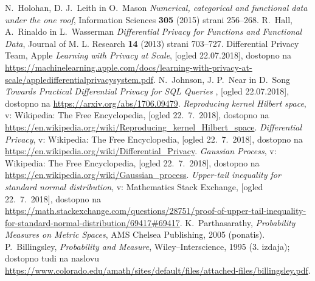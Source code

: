 \documentclass[12pt,a4paper]{amsart}
\theoremstyle{definition} %
\theoremstyle{plain} %
\begin{document}
\begin{thebibliography}{99}

N.~Holohan, D. J.~Leith in O.~Mason \emph{Numerical, categorical and functional data under the one roof}, Information Sciences \textbf{305} (2015) strani 256--268.
R.~Hall, A.~Rinaldo in L.~Wasserman \emph{Differential Privacy for Functions and Functional Data}, Journal of M. L. Research \textbf{14} (2013) strani 703--727.
Differential Privacy Team, Apple \emph{Learning with Privacy at Scale}, [ogled 22.07.2018], dostopno na \url{https://machinelearning.apple.com/docs/learning-with-privacy-at-scale/appledifferentialprivacysystem.pdf}.
N.~Johnson, J. P.~Near in D.~Song \emph{Towards Practical Differential Privacy for SQL Queries
}, [ogled 22.07.2018], dostopno na \url{https://arxiv.org/abs/1706.09479}.
\emph{Reproducing kernel Hilbert space}, v: Wikipedia: The Free Encyclopedia, [ogled 22.~7.~2018], dostopno na \url{https://en.wikipedia.org/wiki/Reproducing_kernel_Hilbert_space}.
\emph{Differential Privacy}, v: Wikipedia: The Free Encyclopedia, [ogled 22.~7.~2018], dostopno na \url{https://en.wikipedia.org/wiki/Differential_Privacy}.
\emph{Gaussian Process}, v: Wikipedia: The Free Encyclopedia, [ogled 22.~7.~2018], dostopno na \url{https://en.wikipedia.org/wiki/Gaussian_process}.
\emph{Upper-tail inequality for standard normal distribution}, v: Mathematics Stack Exchange, [ogled 22.~7.~2018], dostopno na \url{https://math.stackexchange.com/questions/28751/proof-of-upper-tail-inequality-for-standard-normal-distribution/69417#69417}.
K.~Parthasarathy, \emph{Probability Measures on Metric Spaces}, AMS Chelsea Publishing, 2005 (ponatis).
P.~Billingsley, \emph{Probability and Measure}, Wiley--Interscience, 1995 (3. izdaja); dostopno tudi na naslovu \url{https://www.colorado.edu/amath/sites/default/files/attached-files/billingsley.pdf}.




\end{thebibliography}
\end{document}
